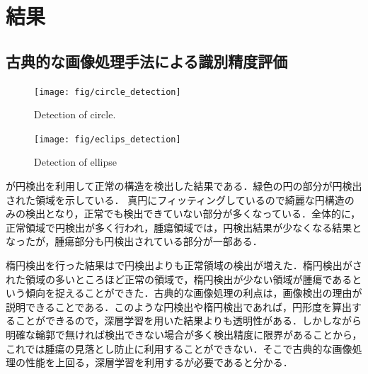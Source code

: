 
\chapter{結果}\label{chap_result}

\section{古典的な画像処理手法による識別精度評価}
\begin{figure}[H]
	\centering
	\texttt{[image: fig/circle\_detection]}
	\caption{Detection of circle.}
	\label{fig:circle_detection}
\end{figure}

\begin{figure}[H]
	\centering
	\texttt{[image: fig/eclips\_detection]}
	\caption{Detection of ellipse}
	\label{fig:ellipse_detection}
\end{figure}

が円検出を利用して正常の構造を検出した結果である．緑色の円の部分が円検出された領域を示している．
真円にフィッティングしているので綺麗な円構造のみの検出となり，正常でも検出できていない部分が多くなっている．全体的に，正常領域で円検出が多く行われ，腫瘍領域では，円検出結果が少なくなる結果となったが，腫瘍部分も円検出されている部分が一部ある．

楕円検出を行った結果はで円検出よりも正常領域の検出が増えた．楕円検出がされた領域の多いところほど正常の領域で，楕円検出が少ない領域が腫瘍であるという傾向を捉えることができた．古典的な画像処理の利点は，画像検出の理由が説明できることである．このような円検出や楕円検出であれば，円形度を算出することができるので，深層学習を用いた結果よりも透明性がある．しかしながら明確な輪郭で無ければ検出できない場合が多く検出精度に限界があることから，これでは腫瘍の見落とし防止に利用することができない．そこで古典的な画像処理の性能を上回る，深層学習を利用するが必要であると分かる．


